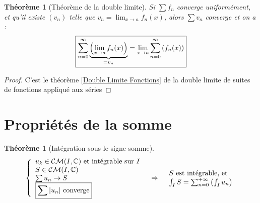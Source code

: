 \documentclass[11pt,a4paper]{report}
\newtheorem{itheorem}[theorem]{Théorème}
\theoremstyle{definition}
\begin{document}
\begin{itheorem}[Théorème de la double limite]
Si $\sum f_n$ \emph{converge uniformément}, et qu'il existe $(v_n)$ telle que $v_n=\displaystyle\lim_{x\to a}f_n(x)$, alors $\sum v_n$ converge et on a :
\[\boxed{\sum^\infty_{n=0}\underbrace{\left(\lim_{x\to a} f_n(x)\right)}_{\mathclap{=v_n}}=\lim_{x\to a}\sum_{n=0}^\infty\left(f_n(x)\right)} \]
\end{itheorem}
\begin{proof}
C'est le théorème \ref{Double Limite Fonctions} de la double limite de suites de fonctions appliqué aux séries
\end{proof}
\section{Propriétés de la somme}
\begin{itheorem}[Intégration sous le signe somme]
\begin{equation}
\begin{array}{r c l}
\left\lbrace
\begin{array}{l}
u_k \in \mathcal{CM}(I,\ensuremath{\mathbb{C}})\text{ et intégrable sur }I\\
S \in \mathcal{CM}(I,\ensuremath{\mathbb{C}})\\
\sum u_n \to S\\
\boxed{\sum |u_n| \text{ converge}} 
\end{array}
\right.&\Rightarrow &
\begin{array}{l}
S\text{ est intégrable, et}\\
\int_I S = \sum_{n=0}^{+\infty} \left( \int_I u_n \right)
\end{array}
\end{array}
\end{equation}
\end{itheorem}
\end{document}
